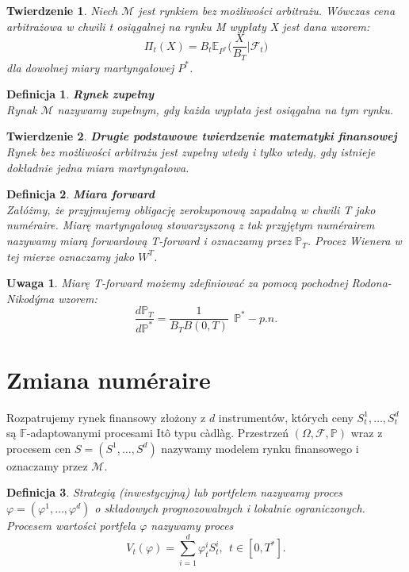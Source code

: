 \documentclass{mini}
\theoremstyle{mythstyle}
\newtheorem{Twierdzenie}{Twierdzenie}[chapter]
\newtheorem{Definicja}{Definicja}[chapter]
\newtheorem{Uwaga}{Uwaga}[chapter]
\begin{document}
\begin{Twierdzenie}
	Niech $\mathcal{M}$ jest rynkiem bez możliwości arbitrażu. Wówczas cena arbitrażowa w chwili t osiągalnej na rynku M wypłaty X jest dana wzorem:
	\begin{equation*}
	\Pi_{t}(X) = B_t \mathbb{E}_{P^*}  \bigg( \frac{X}{B_T}\bigg|\mathcal{ F}_t\bigg)
	\end{equation*}
	dla dowolnej miary martyngałowej $ P^*$.\\
\end{Twierdzenie}
\begin{Definicja} \textbf{Rynek zupełny}\\
	Rynak $\mathcal{M}$ nazywamy zupełnym, gdy każda wypłata jest osiągalna na tym rynku.\\
\end{Definicja}
\begin{Twierdzenie}
	\textbf{Drugie podstawowe twierdzenie matematyki finansowej}\\
	Rynek bez możliwości arbitrażu jest zupełny wtedy i tylko wtedy, gdy istnieje dokładnie jedna miara martyngałowa.\\
\end{Twierdzenie}
\begin{Definicja}
	\textbf{Miara forward}\\
	Załóżmy, że przyjmujemy obligację zerokuponową zapadalną w chwili T jako num\'{e}raire. Miarę martyngałową stowarzyszoną z tak przyjętym num\'{e}rairem nazywamy miarą forwardową T-forward i oznaczamy przez $\mathbb{P}_T$. Procez Wienera w tej mierze oznaczamy jako $W^T$.\\
\end{Definicja}
\begin{Uwaga}
	Miarę T-forward możemy zdefiniować za pomocą pochodnej Rodona-Nikod\'{y}ma wzorem:
	\begin{equation*}
	\frac{d\mathbb{P}_T}{d\mathbb{P^*}} = \frac{1}{B_TB(0,T)} \   \ \mathbb{P^*}-p.n.
	\end{equation*}
\end{Uwaga}
\section{Zmiana num\'{e}raire}
Rozpatrujemy rynek finansowy złożony z $d$ instrumentów, których ceny $S_t^1,\ldots,S_t^d$ są $\mathbb{F}$-adaptowanymi procesami It\^{o} typu c\`{a}dl\`{a}g. Przestrzeń $(\Omega,\mathcal{F}, \mathbb{P})$ wraz z procesem cen $S=(S^1,\ldots,S^d)$ nazywamy modelem rynku finansowego i oznaczamy przez $\mathcal{M}$.\\
\begin{Definicja}
	Strategią (inwestycyjną) lub portfelem nazywamy proces $\varphi=(\varphi^1,\ldots,\varphi^d)$ o składowych prognozowalnych i lokalnie ograniczonych. Procesem wartości portfela $\varphi$ nazywamy proces \[ V_t(\varphi)=\sum_{i=1}^d\varphi_t^iS_t^i, \ \ t\in[0,T^*]. \]
\end{Definicja}
\end{document}
